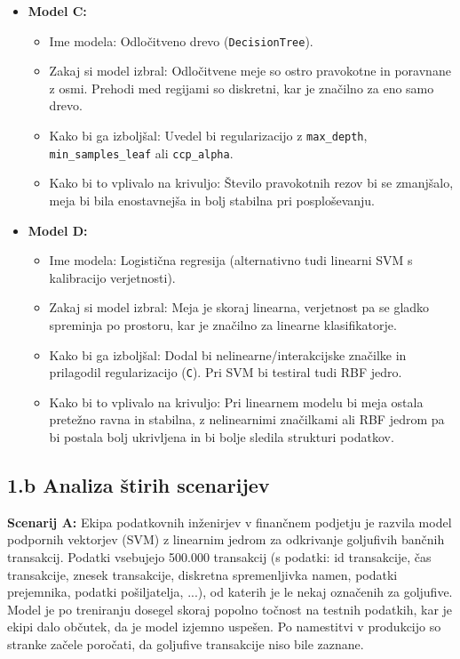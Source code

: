 \documentclass[12pt,a4paper]{article}
\begin{document}
\begin{itemize}
    \item \textbf{Model C:}
    \begin{itemize}
        \item Ime modela: Odločitveno drevo (\texttt{DecisionTree}).
        \item Zakaj si model izbral: Odločitvene meje so ostro pravokotne in poravnane z osmi. Prehodi med regijami so diskretni, kar je značilno za eno samo drevo.
        \item Kako bi ga izboljšal: Uvedel bi regularizacijo z \texttt{max\_depth}, \texttt{min\_samples\_leaf} ali \texttt{ccp\_alpha}.
        \item Kako bi to vplivalo na krivuljo: Število pravokotnih rezov bi se zmanjšalo, meja bi bila enostavnejša in bolj stabilna pri posploševanju.
    \end{itemize}
\newpage
    \item \textbf{Model D:}
    \begin{itemize}
        \item Ime modela: Logistična regresija (alternativno tudi linearni SVM s kalibracijo verjetnosti).
        \item Zakaj si model izbral: Meja je skoraj linearna, verjetnost pa se gladko spreminja po prostoru, kar je značilno za linearne klasifikatorje.
        \item Kako bi ga izboljšal: Dodal bi nelinearne/interakcijske značilke in prilagodil regularizacijo (\texttt{C}). Pri SVM bi testiral tudi RBF jedro.
        \item Kako bi to vplivalo na krivuljo: Pri linearnem modelu bi meja ostala pretežno ravna in stabilna, z nelinearnimi značilkami ali RBF jedrom pa bi postala bolj ukrivljena in bi bolje sledila strukturi podatkov.
    \end{itemize}
\end{itemize}

\subsection*{1.b Analiza štirih scenarijev}
\textbf{Scenarij A:} Ekipa podatkovnih inženirjev v finančnem podjetju je razvila model podpornih vektorjev (SVM) z linearnim jedrom za odkrivanje goljufivih bančnih transakcij. Podatki vsebujejo 500.000 transakcij (s podatki: id transakcije, čas transakcije, znesek transakcije, diskretna spremenljivka namen, podatki prejemnika, podatki pošiljatelja, ...), od katerih je le nekaj označenih za goljufive. Model je po treniranju dosegel skoraj popolno točnost na testnih podatkih, kar je ekipi dalo občutek, da je model izjemno uspešen. Po namestitvi v produkcijo so stranke začele poročati, da goljufive transakcije niso bile zaznane.
\end{document}

